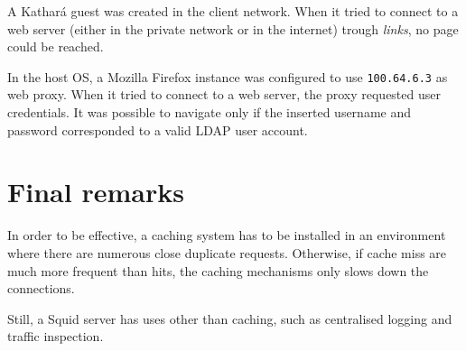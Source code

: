 \documentclass[draft]{homework}
\newcommand{\kat}{Kathará\xspace}
\newcommand{\sq}{Squid\xspace}
\begin{document}
    A \kat guest was created in the client network.
    When it tried to connect to a web server (either in the private network or in the internet) trough \textit{links}, no page could be reached.
    
    In the host OS, a Mozilla Firefox instance was configured to use \texttt{100.64.6.3} as web proxy.
    When it tried to connect to a web server, the proxy requested user credentials.
    It was possible to navigate only if the inserted username and password corresponded to a valid LDAP user account.
    
    
    \section{Final remarks}
    In order to be effective, a caching system has to be installed in an environment where there are numerous close duplicate requests.
    Otherwise, if cache miss are much more frequent than hits, the caching mechanisms only slows down the connections.
    
    Still, a \sq server has uses other than caching, such as centralised logging and traffic inspection.
\end{document}
